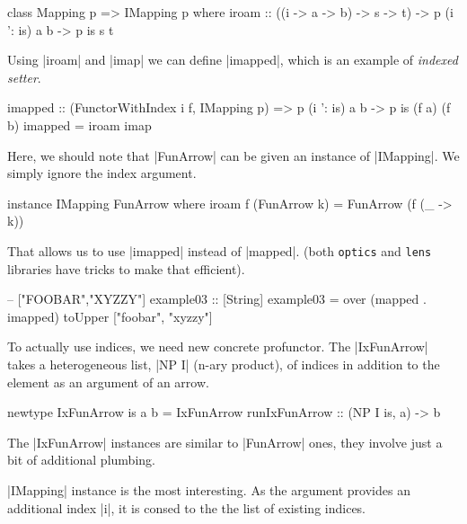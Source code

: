 \begin{code}
class Mapping p => IMapping p where
    iroam :: ((i -> a -> b) -> s -> t) -> p (i ': is) a b -> p is s t
\end{code}

Using |iroam| and |imap| we can define |imapped|,
which is an example of \emph{indexed setter}.

\begin{code}
imapped :: (FunctorWithIndex i f, IMapping p)
        => p (i ': is) a b -> p is (f a) (f b)
imapped = iroam imap
\end{code}

Here, we should note that |FunArrow| can be given an instance of |IMapping|.
We simply ignore the index argument.

\begin{code}
instance IMapping FunArrow where
    iroam f (FunArrow k) = FunArrow (f (\_ -> k))
\end{code}

That allows us to use |imapped| instead of |mapped|.
(both \texttt{optics} and \texttt{lens} libraries have tricks to make that efficient).

\begin{code}
-- ["FOOBAR","XYZZY"]
example03 :: [String]
example03 = over (mapped . imapped) toUpper ["foobar", "xyzzy"]
\end{code}

To actually use indices, we need new concrete profunctor.
The |IxFunArrow| takes a heterogeneous list, |NP I| (n-ary product),
of indices in addition to the element as an argument of an arrow.

\begin{code}
newtype IxFunArrow is a b =
    IxFunArrow { runIxFunArrow :: (NP I is, a) -> b }
\end{code}

The |IxFunArrow| instances are similar to |FunArrow| ones,
they involve just a bit of additional plumbing.

    
|IMapping| instance is the most interesting.
As the argument provides an additional index |i|,
it is consed to the the list of existing indices.


